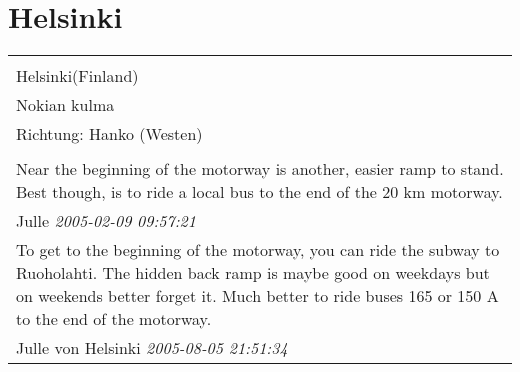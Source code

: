 \documentclass[a4paper,12pt]{article}
\begin{document}
\section{Helsinki}
\begin{tabular}{|p{13cm}|}
\hline\\
Helsinki(Finland)\\
Nokian kulma\\
Richtung: Hanko (Westen) \\
\hline\\
Near the beginning of the motorway is another, easier ramp to stand. Best though, is to ride a local bus to the end of the 20 km motorway. \\
Julle \textit{ 2005-02-09 09:57:21 }\\\hline To get to the beginning of the motorway, you can ride the subway to Ruoholahti. The hidden back ramp is maybe good on weekdays but on weekends better forget it. Much better to ride buses 165 or 150 A to the end of the motorway. \\
Julle von Helsinki \textit{ 2005-08-05 21:51:34 }\\\hline
\end{tabular}
\end{document}
